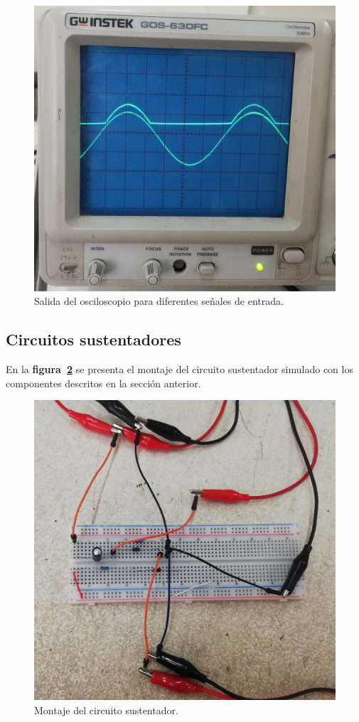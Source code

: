 \documentclass[letter,twoside,11pt]{article}
\begin{document}
\begin{figure}[!h]
\includegraphics[scale=0.068]{fotos/labo1.7.eps}
\caption{Salida del osciloscopio para diferentes señales de entrada.}
\label{labo3}
\end{figure}

\subsection{Circuitos sustentadores}
En la \textbf{figura~\ref{labo4}} se presenta el montaje del circuito
sustentador simulado con los componentes descritos en la sección anterior.

\begin{figure}[!h]
\centering
\includegraphics[scale=0.117]{fotos/labo1.8.eps}
\caption{Montaje del circuito sustentador.}
\label{labo4}
\end{figure}
\end{document}
